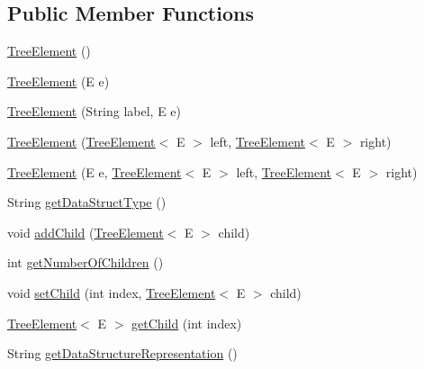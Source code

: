 \subsection*{Public Member Functions}
\begin{DoxyCompactItemize}
\item 
\hyperlink{classbridges_1_1base_1_1_tree_element_ab1af682e9304f5427e308ba5f43d7a9a}{Tree\+Element} ()
\item 
\hyperlink{classbridges_1_1base_1_1_tree_element_a0f17c278536239fb6cba051246ef67a8}{Tree\+Element} (E e)
\item 
\hyperlink{classbridges_1_1base_1_1_tree_element_a476cbeedf2c56f6a40a632035b7d740e}{Tree\+Element} (String label, E e)
\item 
\hyperlink{classbridges_1_1base_1_1_tree_element_aae24dfde287dc0596c69ad853f12f72e}{Tree\+Element} (\hyperlink{classbridges_1_1base_1_1_tree_element}{Tree\+Element}$<$ E $>$ left, \hyperlink{classbridges_1_1base_1_1_tree_element}{Tree\+Element}$<$ E $>$ right)
\item 
\hyperlink{classbridges_1_1base_1_1_tree_element_ace86faa0e65626833c61cc8418cfb1ed}{Tree\+Element} (E e, \hyperlink{classbridges_1_1base_1_1_tree_element}{Tree\+Element}$<$ E $>$ left, \hyperlink{classbridges_1_1base_1_1_tree_element}{Tree\+Element}$<$ E $>$ right)
\item 
String \hyperlink{classbridges_1_1base_1_1_tree_element_a5e0d5f8991d72bd7b0e76d6b0b8662a7}{get\+Data\+Struct\+Type} ()
\item 
void \hyperlink{classbridges_1_1base_1_1_tree_element_a473c29486e99edc725423941b203e939}{add\+Child} (\hyperlink{classbridges_1_1base_1_1_tree_element}{Tree\+Element}$<$ E $>$ child)
\item 
int \hyperlink{classbridges_1_1base_1_1_tree_element_a3722c7cec66ff297f999870df0da3cff}{get\+Number\+Of\+Children} ()
\item 
void \hyperlink{classbridges_1_1base_1_1_tree_element_aefafebb19d64398d150e464e4361ddf0}{set\+Child} (int index, \hyperlink{classbridges_1_1base_1_1_tree_element}{Tree\+Element}$<$ E $>$ child)
\item 
\hyperlink{classbridges_1_1base_1_1_tree_element}{Tree\+Element}$<$ E $>$ \hyperlink{classbridges_1_1base_1_1_tree_element_a4ee40d69ce52fdcac321554564d10aa3}{get\+Child} (int index)
\item 
String \hyperlink{classbridges_1_1base_1_1_tree_element_a674870c91b39fac88d35a569fd505e9b}{get\+Data\+Structure\+Representation} ()
\end{DoxyCompactItemize}
